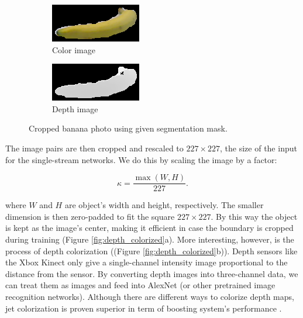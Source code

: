 \begin{figure}
	\centering
	\begin{subfigure}[b]{0.45\linewidth}
		\includegraphics[width=\textwidth]{img/banana_1_1_1_crop.png}
		\caption{Color image}
	\end{subfigure}   	
	\begin{subfigure}[b]{0.45\linewidth}
		\includegraphics[width=\textwidth]{img/banana_1_1_1_depth_crop.png}
		\caption{Depth image}
	\end{subfigure}
	\caption{Cropped banana photo using given segmentation mask.}
	\label{fig:img_cropped}
\end{figure}

The image pairs are then cropped and rescaled to $227 \times 227$, the size of the input for the single-stream networks. We do this by scaling the image by a factor:

\begin{equation}
	\label{equ:rescale}
	\kappa = \frac{\max(W, H)}{227}.
\end{equation}

where $W$ and $H$ are object's width and height, respectively. The smaller dimension is then zero-padded to fit the square $227 \times 227$. By this way the object is kept as the image's center, making it efficient in case the boundary is cropped during training (Figure \ref{fig:depth_colorized}a). More interesting, however, is the process of depth colorization ((Figure \ref{fig:depth_colorized}b)). Depth sensors like the Xbox Kinect only give a single-channel intensity image proportional to the distance from the sensor. By converting depth images into three-channel data, we can treat them as images and feed into AlexNet (or other pretrained image recognition networks). Although there are different ways to colorize depth maps, jet colorization is proven superior in term of boosting system's performance \cite{Eitel2015}.

